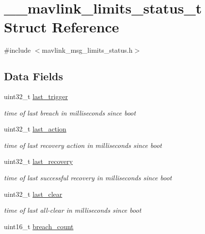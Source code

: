 \hypertarget{struct____mavlink__limits__status__t}{\section{\+\_\+\+\_\+mavlink\+\_\+limits\+\_\+status\+\_\+t Struct Reference}
\label{struct____mavlink__limits__status__t}
}


{\ttfamily \#include $<$mavlink\+\_\+msg\+\_\+limits\+\_\+status.\+h$>$}

\subsection*{Data Fields}
\begin{DoxyCompactItemize}
\item 
uint32\+\_\+t \hyperlink{struct____mavlink__limits__status__t_a9941c756a21de46db70c07cc19247ed1}{last\+\_\+trigger}
\begin{DoxyCompactList}\small\item\em time of last breach in milliseconds since boot \end{DoxyCompactList}\item 
uint32\+\_\+t \hyperlink{struct____mavlink__limits__status__t_a5c4679921b8998a1cd199857a1c06631}{last\+\_\+action}
\begin{DoxyCompactList}\small\item\em time of last recovery action in milliseconds since boot \end{DoxyCompactList}\item 
uint32\+\_\+t \hyperlink{struct____mavlink__limits__status__t_aa274cf1d2ecf847e3ed9bf3e543a7f20}{last\+\_\+recovery}
\begin{DoxyCompactList}\small\item\em time of last successful recovery in milliseconds since boot \end{DoxyCompactList}\item 
uint32\+\_\+t \hyperlink{struct____mavlink__limits__status__t_a3f49dbbe3b4de2c3963a0d75eb7e42c4}{last\+\_\+clear}
\begin{DoxyCompactList}\small\item\em time of last all-\/clear in milliseconds since boot \end{DoxyCompactList}\item 
uint16\+\_\+t \hyperlink{struct____mavlink__limits__status__t_a1dfa5b199ed06265ddd1e824358fbfce}{breach\+\_\+count}

\end{DoxyCompactItemize}
